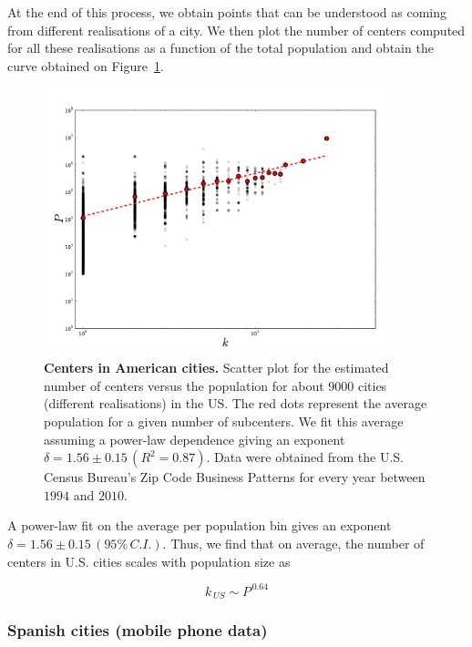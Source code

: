 At the end of this process, we obtain points that can be understood as coming
from different realisations of a city. We then plot the number of centers
computed for all these realisations as a function of the total population and
obtain the curve obtained on Figure~\ref{fig:us_centers}.

\begin{figure}
    \centering
    \includegraphics[width=0.9\textwidth]{gfx/chapter-monocentric/us_num-centers.pdf}
    \caption{{\bf Centers in American cities.} Scatter plot for the estimated number of centers versus the
    population for about 9000 cities (different realisations) in the US. The red
dots represent the average population for a given number of subcenters. We fit
this average assuming a power-law dependence giving an exponent $\delta = 1.56
    \pm 0.15\,(R^2=0.87)$. Data were obtained from the U.S. Census Bureau's Zip
Code Business Patterns for every year between $1994$ and $2010$. \label{fig:us_centers}}
\end{figure}


A power-law fit on the average per population bin gives an exponent $\delta =
1.56 \pm 0.15\,(95\%\,C.I.)$. Thus, we find that on average, the number of
centers in U.S. cities scales with population size as

\begin{equation}
    k_{\,US} \sim P^{\,0.64}
\end{equation}

\subsubsection{Spanish cities (mobile phone data)}
\label{sub:spanish_cities_mobile_phone_data_}

